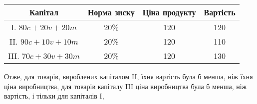 \begin{center}
\begin{tabular}{c c c c}

\toprule
Капітал & Норма зиску & Ціна продукту & Вартість \\
\midrule

\phantom{II}I. $80 c + 20 v + 20 m$ & 20\% & 120 &  120 \\

\phantom{I}II.    $90 c + 10 v + 10 m$ & 20\% & 120 & 110\\

III. $70 c + 30 v + 30 m$ & 20\% & 120 & 130 \\
\end{tabular}
\end{center}
Отже, для товарів, вироблених капіталом II, їхня вартість була б
менша, ніж їхня ціна виробництва, для товарів капіталу III ціна
виробництва була б менша, ніж вартість, і тільки для капіталів I,
\parbreak{}  %
